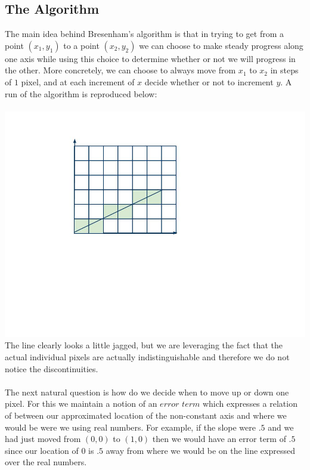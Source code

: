 \documentclass[10pt,a4paper,titlepage]{book}
\begin{document}
\subsection{The Algorithm}
The main idea behind Bresenham's algorithm is that in trying to get from a point $(x_1, y_1)$ to a point $(x_2, y_2)$ we can choose to make steady progress along one axis while using this choice to determine whether or not we will progress in the other. More concretely, we can choose to always move from $x_1$ to $x_2$ in steps of $1$ pixel, and at each increment of $x$ decide whether or not to increment $y$. A run of the algorithm is reproduced below: \\\\
\includegraphics[bb=0 0 400 400,scale=.5]{imgs/BresenhamsLineAlgorithm.jpg}\\
The line clearly looks a little jagged, but we are leveraging the fact that the actual individual pixels are actually indistinguishable and therefore we do not notice the discontinuities.\\\\
The next natural question is how do we decide when to move up or down one pixel. For this we maintain a notion of an $error$ $term$ which expresses a relation of between our approximated location of the non-constant axis and where we would be were we using real numbers. For example, if the slope were $.5$ and we had just moved from $(0,0)$ to $(1,0)$ then we would have an error term of $.5$ since our location of $0$ is $.5$ away from where we would be on the line expressed over the real numbers. \\\\
\end{document}
